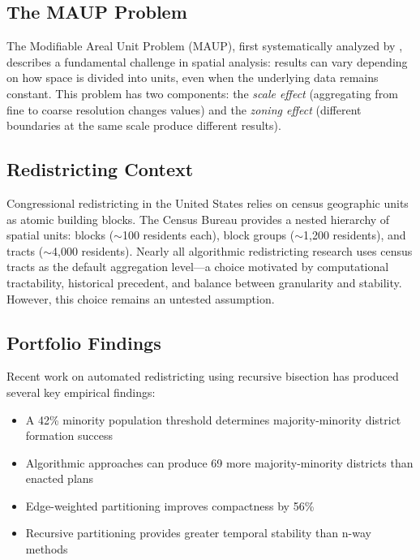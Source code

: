 
\subsection{The MAUP Problem}

The Modifiable Areal Unit Problem (MAUP), first systematically analyzed by \citet{openshaw1984modifiable}, describes a fundamental challenge in spatial analysis: results can vary depending on how space is divided into units, even when the underlying data remains constant. This problem has two components: the \emph{scale effect} (aggregating from fine to coarse resolution changes values) and the \emph{zoning effect} (different boundaries at the same scale produce different results).

\subsection{Redistricting Context}

Congressional redistricting in the United States relies on census geographic units as atomic building blocks. The Census Bureau provides a nested hierarchy of spatial units: blocks ($\sim$100 residents each), block groups ($\sim$1,200 residents), and tracts ($\sim$4,000 residents). Nearly all algorithmic redistricting research uses census tracts as the default aggregation level---a choice motivated by computational tractability, historical precedent, and balance between granularity and stability. However, this choice remains an untested assumption.

\subsection{Portfolio Findings}

Recent work on automated redistricting using recursive bisection has produced several key empirical findings:
\begin{itemize}
    \item A 42\% minority population threshold determines majority-minority district formation success \citep{threshold-paper}
    \item Algorithmic approaches can produce 69 more majority-minority districts than enacted plans \citep{vra-compliance-paper}
    \item Edge-weighted partitioning improves compactness by 56\% \citep{edge-weighted-paper}
    \item Recursive partitioning provides greater temporal stability than n-way methods \citep{temporal-stability-paper}
\end{itemize}

